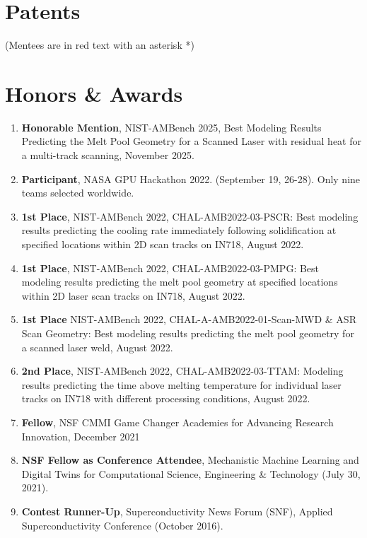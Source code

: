 \documentclass[11pt, letterpaper]{article}
\begin{document}
\section{Patents}
(Mentees are in red text with an asterisk *)
\nocite{*}
\begin{refcontext}[labelprefix=P]
    \printbibliography[heading=none, type=patent, title={Patents}]
\end{refcontext}


\section{Honors \& Awards}
   \begin{enumerate}[label=\arabic*., itemsep=-1pt, topsep=2pt]
        \item \textbf{Honorable Mention}, NIST-AMBench 2025, Best Modeling Results Predicting the Melt Pool Geometry for a Scanned Laser with residual heat for a multi-track scanning, November 2025.
        \item \textbf{Participant}, NASA GPU Hackathon 2022. (September 19, 26-28). Only nine teams selected worldwide.
        \item \textbf{1st Place}, NIST-AMBench 2022, CHAL-AMB2022-03-PSCR: Best modeling results predicting the cooling rate immediately following solidification at specified locations within 2D scan tracks on IN718, August 2022.
        \item \textbf{1st Place}, NIST-AMBench 2022, CHAL-AMB2022-03-PMPG: Best modeling results predicting the melt pool geometry at specified locations within 2D laser scan tracks on IN718, August 2022.
        \item \textbf{1st Place} NIST-AMBench 2022, CHAL-A-AMB2022-01-Scan-MWD \& ASR Scan Geometry: Best modeling results predicting the melt pool geometry for a scanned laser weld, August 2022.
        \item \textbf{2nd Place},  NIST-AMBench 2022, CHAL-AMB2022-03-TTAM: Modeling results predicting the time above melting temperature for individual laser tracks on IN718 with different processing conditions, August 2022.
        \item \textbf{Fellow}, NSF CMMI Game Changer Academies for Advancing Research Innovation, December 2021
        \item \textbf {NSF Fellow as Conference Attendee}, Mechanistic Machine Learning and Digital Twins for Computational Science, Engineering \& Technology (July 30, 2021).
        \item \textbf{Contest Runner-Up}, Superconductivity News Forum (SNF), Applied Superconductivity Conference (October 2016).

\end{enumerate}
\end{document}
